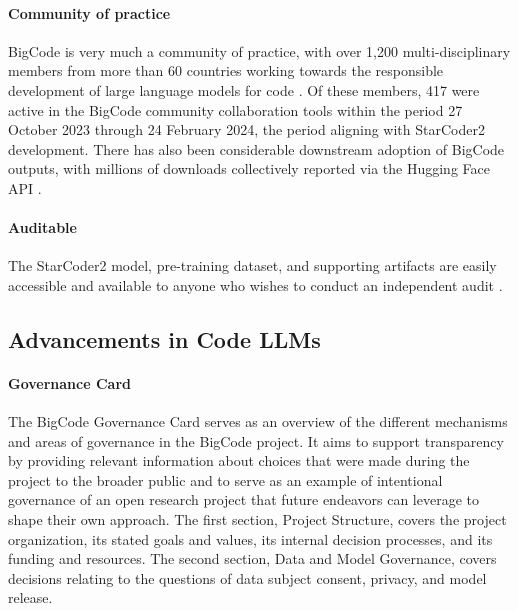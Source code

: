 \documentclass[10pt]{article} %
\begin{document}
\paragraph{Community of practice} BigCode is very much a community of practice, with over 1,200 multi-disciplinary members from more than 60 countries working towards the responsible development of large language models for code \citep{sholler2019ten, kocetkov2023stack, allal2023santacoder, li2023starcoder,muennighoff2023octopack,zhuo2024astraios}. Of these members, 417 were active in the BigCode community collaboration tools within the period 27 October 2023 through 24 February 2024, the period aligning with StarCoder2 development. There has also been considerable downstream adoption of BigCode outputs, with millions of downloads collectively reported via the Hugging Face API \citep{bigcode2024models}.

\paragraph{Auditable} The StarCoder2 model, pre-training dataset, and supporting artifacts are easily accessible and available to anyone who wishes to conduct an independent audit \citep{solaiman2023gradient, mokander2023auditing, bigcodecollaboration2023bigcode}. 


\subsection{Advancements in Code LLMs}

\paragraph{Governance Card}  The BigCode Governance Card \citep{bigcodecollaboration2023bigcode} serves as an overview of the different mechanisms and areas of governance in the BigCode project. It aims to support transparency by providing relevant information about choices that were made during the project to the broader public and to serve as an example of intentional governance \citep{sholler2019ten} of an open research project that future endeavors can leverage to shape their own approach. The first section, Project Structure, covers the project organization, its stated goals and values, its internal decision processes, and its funding and resources. The second section, Data and Model Governance, covers decisions relating to the questions of data subject consent, privacy, and model release.
\end{document}
